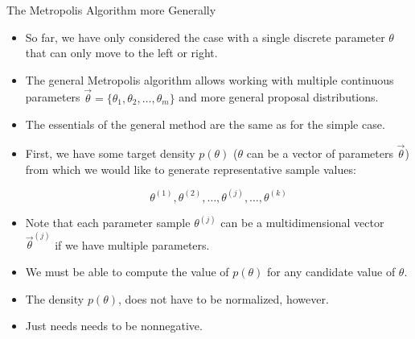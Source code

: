 \documentclass[handout]{beamer}
\begin{document}
\begin{frame}{The Metropolis Algorithm more Generally}
\scriptsize{

\begin{itemize}
\item So far, we have only considered the case with a single discrete parameter $\theta$ that can only move to the left or right.

\item The general Metropolis algorithm allows working with multiple continuous parameters $\vec{\theta}=\{\theta_1,\theta_2,\dots,\theta_m\}$ and more general proposal distributions.


\item The essentials of the general method are the same as for the simple case. 

\item First, we have some target density $p(\theta)$ ($\theta$ can be a vector of parameters $\vec{\theta}$) from which we would like to generate representative sample values:

\begin{displaymath}
\theta^{(1)},\theta^{(2)},\dots,\theta^{(j)}, \dots, \theta^{(k)}
\end{displaymath}

\item Note that each parameter sample $\theta^{(j)}$  can be a multidimensional vector $\vec{\theta}^{(j)}$ if we have multiple parameters.

\item We must be able to compute the value of $p(\theta)$ for any candidate value of $\theta$.
\item The density $p(\theta)$, does not have to be normalized, however.

\item Just needs needs to be nonnegative. 


\end{itemize}


} 
\end{frame}
\end{document}
